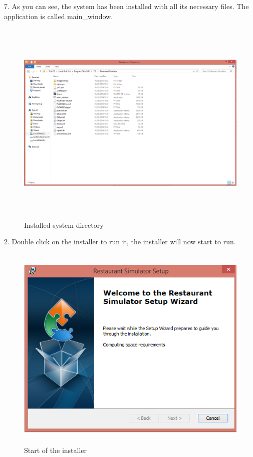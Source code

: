 \begin{landscape}
7. As you can see, the system has been installed with all its necessary files. The application is called main\_window.

\begin{figure}[H]
    \includegraphics[height = 10cm]{./Manual/images/install7} 
    \caption{Installed system directory} \label{fig:install7}
\end{figure}



2. Double click on the installer to run it, the installer will now start to run.

\begin{figure}[H]
    \includegraphics[height = 10cm]{./Manual/images/install2} 
    \caption{Start of the installer} \label{fig:install2}
\end{figure}


\end{landscape}
